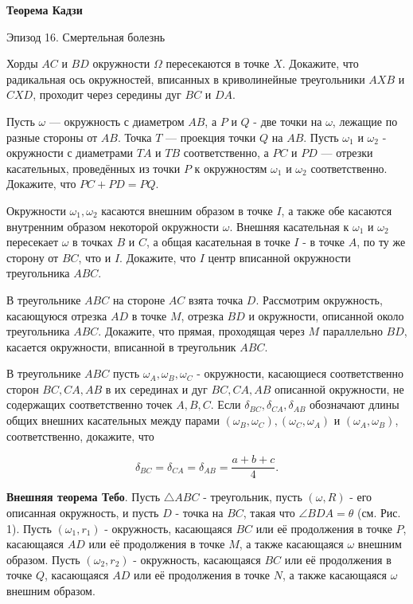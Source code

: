 \centerline{\bf \Huge Теорема Кадзи}

\begin{flushright}
        \scriptsize{Эпизод 16. Смертельная болезнь}
\end{flushright}

Хорды $A C$ и $B D$ окружности $\Omega$ пересекаются в точке $X$. Докажите, что радикальная ось окружностей, вписанных в криволинейные треугольники $A X B$ и $C X D$, проходит через середины дуг $B C$ и $D A$.

Пусть $\omega$ --- окружность с диаметром $A B$, а $P$ и $Q$ - две точки на $\omega$, лежащие по разные стороны от $A B$. Точка $T$ --- проекция точки $Q$ на $A B$. Пусть $\omega_1$ и $\omega_2$ - окружности с диаметрами $T A$ и $T B$ соответственно, а $P C$ и $P D$ --- отрезки касательных, проведённых из точки $P$ к окружностям $\omega_1$ и $\omega_2$ соответственно. Докажите, что $P C+P D=P Q.$

Окружности $\omega_1, \omega_2$ касаются внешним образом в точке $I$, а также обе касаются внутренним образом некоторой окружности $\omega$. Внешняя касательная к $\omega_1$ и $\omega_2$ пересекает $\omega$ в точках $B$ и $C$, а общая касательная в точке $I$ - в точке $A$, по ту же сторону от $B C$, что и $I$. Докажите, что $I$ центр вписанной окружности треугольника $A B C$.

В треугольнике $A B C$ на стороне $A C$ взята точка $D$. Рассмотрим окружность, касающуюся отрезка $A D$ в точке $M$, отрезка $B D$ и окружности, описанной около треугольника $A B C$. Докажите, что прямая, проходящая через $M$ параллельно $B D$, касается окружности, вписанной в треугольник $A B C$.

В треугольнике $A B C$ пусть $\omega_A, \omega_B, \omega_C$ - окружности, касающиеся соответственно сторон $B C, C A, A B$ в их серединах и дуг $B C, C A, A B$ описанной окружности, не содержащих соответственно точек $A, B, C$. Если $\delta_{B C}, \delta_{C A}, \delta_{A B}$ обозначают длины общих внешних касательных между парами $\left(\omega_B, \omega_C\right),\left(\omega_C, \omega_A\right)$ и $\left(\omega_A, \omega_B\right)$, соответственно, докажите, что

$$
\delta_{B C}=\delta_{C A}=\delta_{A B}=\frac{a+b+c}{4} .
$$

\textbf{Внешняя теорема Тебо}. Пусть $\triangle A B C$ - треугольник, пусть $(\omega, R)$ - его описанная окружность, и пусть $D$ - точка на $B C$, такая что $\angle B D A=\theta$ (см. Рис. 1). Пусть $\left(\omega_1, r_1\right)$ - окружность, касающаяся $B C$ или её продолжения в точке $P$, касающаяся $A D$ или её продолжения в точке $M$, а также касающаяся $\omega$ внешним образом. Пусть $\left(\omega_2, r_2\right)$ - окружность, касающаяся $B C$ или её продолжения в точке $Q$, касающаяся $A D$ или её продолжения в точке $N$, а также касающаяся $\omega$ внешним образом. 

